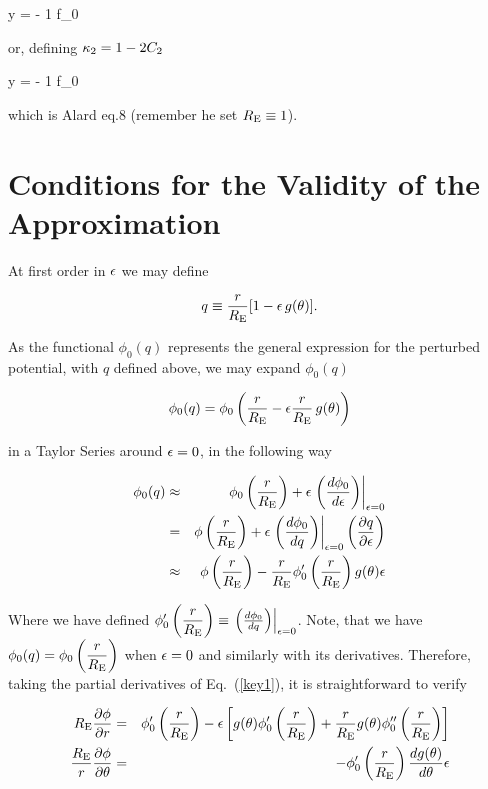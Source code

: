 \beq
 y = \left[ (1-2 C_2) x -  f_1 \right]  - {1 \over \re} {\prtl f_0 \over \prtl \te} \hat{\theta}
\eeq

or, defining $\kappa_2 = 1-2 C_2$

\beq
\label{eq:rsexpanded}
 y = \left[ \kt x - f_1 \right]  - {1 \over \re} {\prtl f_0 \over \prtl \te}  \hat{\theta}
\eeq

which is Alard eq.8 (remember he set $R_{\mathrm{E}} \equiv 1$).


\section{Conditions for the Validity of the Approximation}

At first order in $\epsilon$ we may define

\begin{equation}
 q \equiv \frac{r}{R_{\mathrm{E}}}[1-\epsilon\,g(\theta)].
\end{equation}

As the functional $\phi_0(q)$ represents the general expression
for the perturbed potential, with $q$ defined above, we may expand $\phi_0(q)$

\begin{displaymath}
 \phi_0(q)=\phi_0\left(\dfrac{r}{R_{\mathrm{E}}}-\epsilon\dfrac{r}{R_{\mathrm{E}}}\,g(\theta)\right)
\end{displaymath}

\noindent in a Taylor Series around $\epsilon=0$, in the following way

\def\dpdq{ \left. \left( \frac{d\phi_0}{dq}\right) \right|_{\eps=0} }
\def\dpde{ \left. \left( \frac{d\phi_0}{d\eps}\right) \right|_{\eps=0} }

\begin{eqnarray}
 \phi_0(q) &\approx& \phi_0\prre+\eps \dpde \\
	  & = & \phi\prre+\eps \dpdq  \left(\frac{\prtl q}{\prtl \eps}\right)\\
	  &\approx& \phi\prre-\rre\phi_0^\prime\prre g(\te)\eps \label{key1}
\end{eqnarray}

Where we have defined $\phi_0^\prime\prre \equiv  \dpdq$.  Note, that we have $\phi_0(q)=\phi_0\left( \dfrac{r}{R_{\mathrm{E}}}\right)$ when $\epsilon=0$ and similarly with its derivatives. Therefore,
taking the partial derivatives of Eq.~(\ref{key1}), it is straightforward to verify

\begin{eqnarray}
 \re\frac{\prtl \phi}{\prtl r}&=& \phi_0^\prime\prre -%
  \eps\left[g(\te)\phi_0^\prime\prre+\rre g(\te)\phi_0^{\prime \prime}\prre\right]\\
\frac{\re}{r}\frac{\prtl \phi}{\prtl \te}&=&-\phi_0^\prime\prre \frac{dg(\te)}{d\te}\eps
\end{eqnarray}

